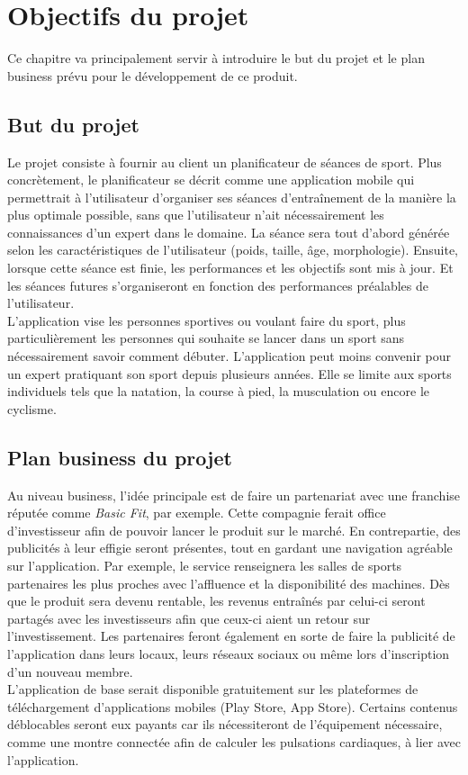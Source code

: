 \chapter{Objectifs du projet}

Ce chapitre va principalement servir à introduire le but du projet et le plan business prévu pour le développement de ce produit.

\section{But du projet}

Le projet consiste à fournir au client un planificateur de séances de sport. Plus concrètement, le planificateur se décrit comme une application mobile qui permettrait à l'utilisateur d'organiser ses séances d'entraînement de la manière la plus optimale possible, sans que l'utilisateur n'ait nécessairement les connaissances d'un expert dans le domaine. La séance sera tout d'abord générée selon les caractéristiques de l'utilisateur (poids, taille, âge, morphologie). Ensuite, lorsque cette séance est finie, les performances et les objectifs sont mis à jour. Et les séances futures s'organiseront en fonction des performances préalables de l'utilisateur.\\

L'application vise les personnes sportives ou voulant faire du sport, plus particulièrement les personnes qui souhaite se lancer dans un sport sans nécessairement savoir comment débuter. L'application peut moins convenir pour un expert pratiquant son sport depuis plusieurs années. Elle se limite aux sports individuels tels que la natation, la course à pied, la musculation ou encore le cyclisme. 

\section{Plan business du projet}

Au niveau business, l'idée principale est de faire un partenariat avec une franchise réputée comme \textit{Basic Fit}, par exemple. Cette compagnie ferait office d'investisseur afin de pouvoir lancer le produit sur le marché. En contrepartie, des publicités à leur effigie seront présentes, tout en gardant une navigation agréable sur l'application. Par exemple, le service renseignera les salles de sports partenaires les plus proches avec l'affluence et la disponibilité des machines. Dès que le produit sera devenu rentable, les revenus entraînés par celui-ci seront partagés avec les investisseurs afin que ceux-ci aient un retour sur l'investissement. Les partenaires feront également en sorte de faire la publicité de l'application dans leurs locaux, leurs réseaux sociaux ou même lors d'inscription d'un nouveau membre.\\

L'application de base serait disponible gratuitement sur les plateformes de téléchargement d'applications mobiles (Play Store, App Store). Certains contenus déblocables seront eux payants car ils nécessiteront de l'équipement nécessaire, comme une montre connectée afin de calculer les pulsations cardiaques, à lier avec l'application.
